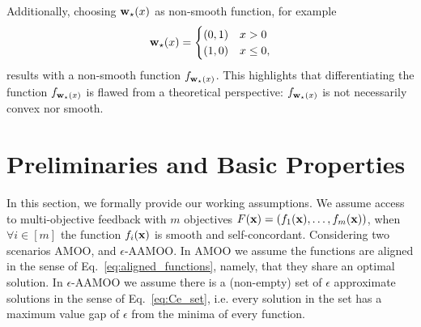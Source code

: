 Additionally, choosing ${\mathbf{w}}_\star(x)$ as  non-smooth function, for example
\begin{align*}
    {\mathbf{w}}_\star(x)=
    \begin{cases}
        (0,1) & x>0\\
        (1,0) & x\leq 0,
    \end{cases}
\end{align*}
results with a non-smooth function $f_{{\mathbf{w}}_\star(x)}$. This highlights that differentiating the function $f_{{\mathbf{w}}_\star(x)}$ is flawed from a theoretical perspective:  $f_{{\mathbf{w}}_\star(x)}$ is not necessarily convex nor smooth.



\section{Preliminaries and Basic Properties}\label{app:pre_and_prp}

In this section, we formally provide our working assumptions. We assume access to multi-objective feedback with $m$ objectives $F({\mathbf{x}}) = (f_1({\mathbf{x}}),\ldots,f_m({\mathbf{x}}))$, when $\forall i \in [m]$ the function $f_i({\mathbf{x}}) $ is smooth and self-concordant.  Considering two scenarios AMOO, and  $\epsilon$-AAMOO. In AMOO we assume the functions are aligned in the sense of Eq.~\eqref{eq:aligned_functions}, namely, that they share an optimal solution. In $\epsilon$-AAMOO we assume there is a (non-empty) set of $\epsilon$ approximate solutions in the sense of Eq.~\eqref{eq:Ce_set}, i.e. every solution in the set has a maximum value gap of $\epsilon$ from the minima of every function.

